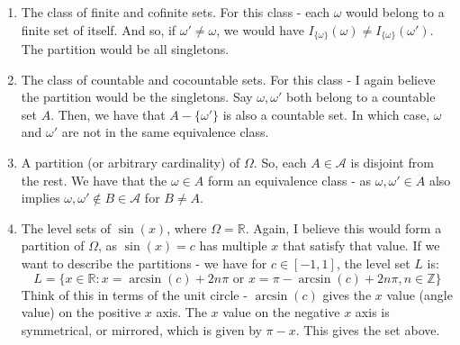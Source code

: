 \documentclass[12pt,a4paper]{article}
\newcommand{\1}[1]{\mathbbm{1}\left\{ #1 \right\}}
\newcommand{\R}{\mathbb{R}}
\newcommand{\Z}{\mathbb{Z}}
\newcommand{\acal}{\mathcal{A}}
\begin{document}
\begin{enumerate}
	\item The class of finite and cofinite sets. For this class - each $\omega$ would belong to a finite set of itself. And so, if $\omega' \neq \omega$, we would have $I_{\{\omega\}}(\omega) \neq I_{\{\omega\}}(\omega')$. The partition would be all singletons.
	
	\item The class of countable and cocountable sets. For this class - I again believe the partition would be the singletons. Say $\omega, \omega'$ both belong to a countable set $A$. Then, we have that $A - \{\omega'\}$ is also a countable set. In which case, $\omega$ and $\omega'$ are not in the same equivalence class.
	
	\item A partition (or arbitrary cardinality) of $\Omega$. So, each $A \in \acal$ is disjoint from the rest. We have that the $\omega \in A$ form an equivalence class - as $\omega,\omega' \in A$ also implies $\omega,\omega' \not\in B \in \acal$ for $B \neq A$.
	
	\item The level sets of $\sin(x)$, where $\Omega = \R$. Again, I believe this would form a partition of $\Omega$, as $\sin(x) = c$ has multiple $x$ that satisfy that value. If we want to describe the partitions - we have for $c \in [-1,1]$, the level set $L$ is:
	$$
		L = \{x \in \R : x = \arcsin(c) + 2n\pi \text{ or } x = \pi - \arcsin(c) + 2n\pi, n \in \Z\}
	$$
	Think of this in terms of the unit circle - $\arcsin(c)$ gives the $x$ value (angle value) on the positive $x$ axis. The $x$ value on the negative $x$ axis is symmetrical, or mirrored, which is given by $\pi - x$. This gives the set above.
	

\end{enumerate}
\end{document}
